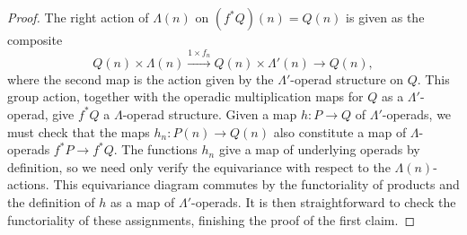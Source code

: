 \begin{proof}
The right action of $\Lambda(n)$ on $(f^{*}Q)(n) = Q(n)$ is given as the composite
\[
Q(n) \times \Lambda(n) \stackrel{1 \times f_n}{\to} Q(n) \times \Lambda'(n) \to Q(n),
\]
where the second map is the action given by the $\Lambda'$-operad structure on $Q$.
This group action, together with the operadic multiplication maps for $Q$ as a $\Lambda'$-operad, give $f^*Q$ a $\Lambda$-operad structure.
Given a map $h \colon P \to Q$ of $\Lambda'$-operads, we must check that the maps $h_n \colon P(n) \to Q(n)$ also constitute a map of $\Lambda$-operads $f^*P \to f^*Q$.
The functions $h_n$ give a map of underlying operads by definition, so we need only verify the equivariance with respect to the $\Lambda(n)$-actions.
This equivariance diagram commutes by the functoriality of products and the definition of $h$ as a map of $\Lambda'$-operads.
It is then straightforward to check the functoriality of these assignments, finishing the proof of the first claim.


\end{proof}
